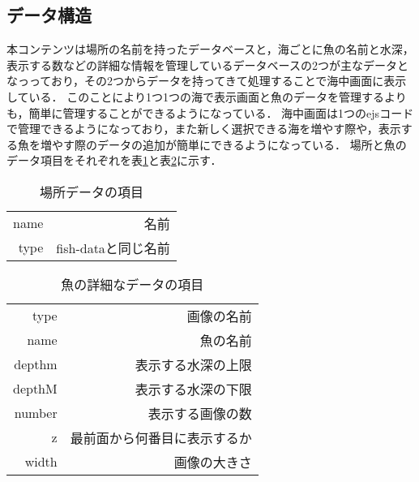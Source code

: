 \documentclass[12pt,a4j,titlepage]{ltjsarticle}
\begin{document}
\subsection{データ構造}
本コンテンツは場所の名前を持ったデータベースと，海ごとに魚の名前と水深，表示する数などの詳細な情報を管理しているデータベースの2つが主なデータとなっっており，その2つからデータを持ってきて処理することで海中画面に表示している．
このことにより1つ1つの海で表示画面と魚のデータを管理するよりも，簡単に管理することができるようになっている．
海中画面は1つのejsコードで管理できるようになっており，また新しく選択できる海を増やす際や，表示する魚を増やす際のデータの追加が簡単にできるようになっている．
場所と魚のデータ項目をそれぞれを表\ref{table:place}と表\ref{table:fish-data}に示す．
\begin{table}[h]
\centering
  \caption{場所データの項目}
  \label{table:place}
  \small
  \begin{tabular}{rr}
  name &  名前  \\
   type &  fish-dataと同じ名前  \\
  \end{tabular}
  \end{table}

\begin{table}[h]
\centering
  \caption{魚の詳細なデータの項目}
  \label{table:fish-data}
  \small
  \begin{tabular}{rr}
   type &  画像の名前\\
   name & 魚の名前 \\
   depthm &  表示する水深の上限 \\
   depthM &  表示する水深の下限\\
   number & 表示する画像の数 \\
   z & 最前面から何番目に表示するか  \\
   width & 画像の大きさ \\
  \end{tabular}
  \end{table}
\end{document}
